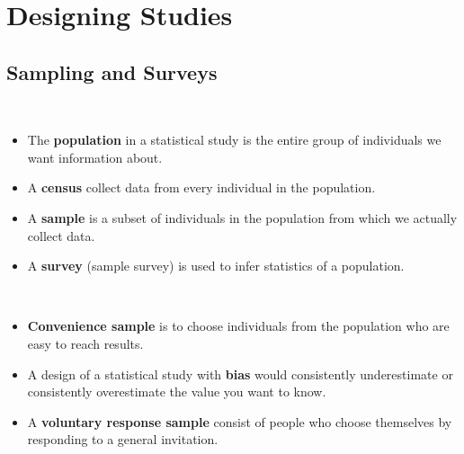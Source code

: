 \documentclass[Main.tex]{subfiles}
\begin{document}
	
	\chapter{Designing Studies}
	
	
	\section{Sampling and Surveys}
	
	\begin{example} \hfill \\
		\begin{itemize}
			\item The \textbf{population} in a statistical study is the entire group of individuals we want information about.\\
			\item A \textbf{census} collect data from every individual in the population.\\
			\item A \textbf{sample} is a subset of individuals in the population from which we actually collect data.\\
			\item A \textbf{survey} (sample survey) is used to infer statistics of a population.
		\end{itemize}
	\end{example}
	
	\begin{example} \hfill \\
		\begin{itemize}
			\item \textbf{Convenience sample} is to choose individuals from the population who are easy to reach results.\\
			\item A design of a statistical study with \textbf{bias} would consistently underestimate or consistently overestimate the value you want to know.\\
			\item A \textbf{voluntary response sample} consist of people who choose themselves by responding to a general invitation.
		\end{itemize}
	\end{example}
	
\end{document}
